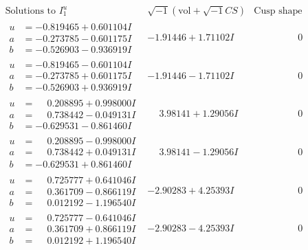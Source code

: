 \documentclass[1p]{elsarticle_modified}
\theoremstyle{definition}
\newcommand{\I}{\sqrt{-1}}
\begin{document}
$$\begin{array}{c|c|c}  
\text{Solutions to }I^u_{1}& \I (\text{vol} + \sqrt{-1}CS) & \text{Cusp shape}\\
 \hline 
\begin{aligned}
u &= -0.819465 + 0.601104 I \\
a &= -0.273785 - 0.601175 I \\
b &= -0.526903 - 0.936919 I\end{aligned}
 & -1.91446 + 1.71102 I & \phantom{-0.000000 } 0 \\ \hline\begin{aligned}
u &= -0.819465 - 0.601104 I \\
a &= -0.273785 + 0.601175 I \\
b &= -0.526903 + 0.936919 I\end{aligned}
 & -1.91446 - 1.71102 I & \phantom{-0.000000 } 0 \\ \hline\begin{aligned}
u &= \phantom{-}0.208895 + 0.998000 I \\
a &= \phantom{-}0.738442 - 0.049131 I \\
b &= -0.629531 - 0.861460 I\end{aligned}
 & \phantom{-}3.98141 + 1.29056 I & \phantom{-0.000000 } 0 \\ \hline\begin{aligned}
u &= \phantom{-}0.208895 - 0.998000 I \\
a &= \phantom{-}0.738442 + 0.049131 I \\
b &= -0.629531 + 0.861460 I\end{aligned}
 & \phantom{-}3.98141 - 1.29056 I & \phantom{-0.000000 } 0 \\ \hline\begin{aligned}
u &= \phantom{-}0.725777 + 0.641046 I \\
a &= \phantom{-}0.361709 - 0.866119 I \\
b &= \phantom{-}0.012192 - 1.196540 I\end{aligned}
 & -2.90283 + 4.25393 I & \phantom{-0.000000 } 0 \\ \hline\begin{aligned}
u &= \phantom{-}0.725777 - 0.641046 I \\
a &= \phantom{-}0.361709 + 0.866119 I \\
b &= \phantom{-}0.012192 + 1.196540 I\end{aligned}
 & -2.90283 - 4.25393 I & \phantom{-0.000000 } 0 \\ \hline\begin{aligned}

\end{aligned}
\end{array}$$
\end{document}

